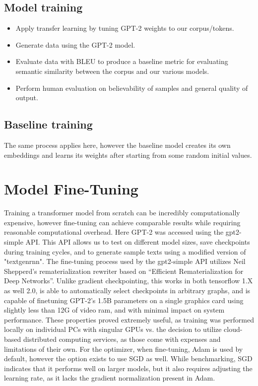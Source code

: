 \documentclass[11pt]{article}
\begin{document}
\subsection{Model training}

\begin{itemize}

\item Apply transfer learning by tuning GPT-2 weights to our corpus/tokens.
\item Generate data using the GPT-2 model.
\item Evaluate data with BLEU to produce a baseline metric for evaluating semantic similarity between the corpus and our various models.
\item Perform human evaluation on believability of samples and general quality of output.

\end{itemize}

\subsection{Baseline training}

The same process applies here, however the baseline model creates its own embeddings and learns its weights after starting from some random initial values.

\section{Model Fine-Tuning}

Training a transformer model from scratch can be incredibly computationally expensive, however fine-tuning can achieve comparable results while requiring reasonable computational overhead. Here GPT-2 was accessed using the gpt2-simple API. This API allows us to test on different model sizes, save checkpoints during training cycles, and to generate sample texts using a modified version of "textgenrnn". The fine-tuning process used by the gpt2-simple API utilizes Neil Shepperd's rematerialization rewriter based on “Efficient Rematerialization for Deep Networks”\cite{nipsDN}. Unlike gradient checkpointing, this works in both tensorflow 1.X as well 2.0, is able to automatically select checkpoints in arbitrary graphs, and is capable of finetuning GPT-2's 1.5B parameters on a single graphics card using slightly less than 12G of video ram, and with minimal impact on system performance. These properties proved extremely useful, as training was performed locally on individual PCs with singular GPUs vs. the decision to utilize cloud-based distributed computing services, as those come with expenses and limitations of their own. For the optimizer, when fine-tuning, Adam is used by default, however the option exists to use SGD as well. While benchmarking, SGD indicates that it performs well on larger models, but it also requires adjusting the learning rate, as it lacks the gradient normalization present in Adam.
\end{document}

